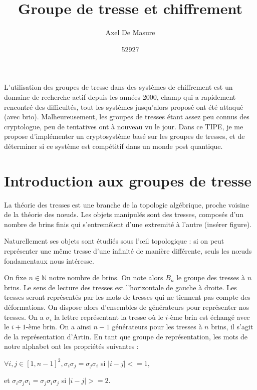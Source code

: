 \documentclass[a4paper,100pt]{article}
\begin{document}
\title{\textbf{Groupe de tresse et chiffrement}}
\author{Axel De Masure}

\date{52927}
\maketitle
\graphicspath{ {./} }

L'utilisation des groupes de tresse dans des systèmes de chiffrement est un domaine de recherche actif depuis les années 2000, champ qui a rapidement rencontré des difficultés, tout les systèmes jusqu'alors proposé ont été attaqué (avec brio). Malheureusement, les groupes de tresses étant assez peu connus des cryptologue, peu de tentatives ont à nouveau vu le jour. Dans ce TIPE, je me propose d'implémenter un cryptosystème basé sur les groupes de tresses, et de déterminer si ce système est compétitif dans un monde post quantique.

\section{Introduction aux groupes de tresse}
La théorie des tresses est une branche de la topologie algébrique, proche voisine de la théorie des nœuds. Les objets manipulés sont des tresses, composés d'un nombre de brins finis qui s'entremêlent d'une extremité à l'autre (insérer figure).


Naturellement ses objets sont étudiés sous l'œil topologique : si on peut représenter une même tresse d'une infinité de manière différente, seuls les nœuds fondamentaux nous intéresse.

On fixe $ n \in \mathbb{N} $ notre nombre de brins. On note alors $B_n$ le groupe des tresses à $n$ brins. Le sens de lecture des tresses est l'horizontale de gauche à droite. Les tresses seront représentés par les mots de tresses qui ne tiennent pas compte des déformations. On dispose alors d'ensembles de générateurs pour représenter nos tresses. On a $\sigma_i$ la lettre représentant la tresse où le $i$-ème brin est échangé avec le $i+1$-ème brin. On a ainsi $n-1$ générateurs pour les tresses à $n$ brins, il s'agit de la représentation d'Artin.
En tant que groupe de représentation, les mots de notre alphabet ont les propriétés suivantes :

$\forall i,j \in [1,n-1]^2, \sigma_i\sigma_j = \sigma_j\sigma_i$ si $|i-j| <= 1$,

et $\sigma_i\sigma_j\sigma_i = \sigma_j\sigma_i\sigma_j$ si $|i-j| >= 2$.
\end{document}

